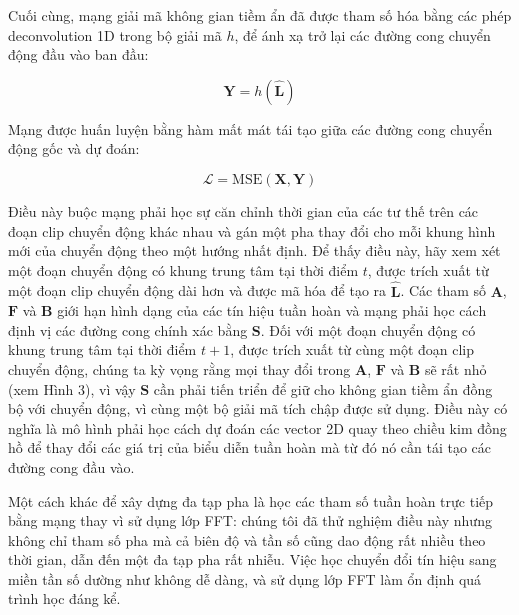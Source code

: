 Cuối cùng, mạng giải mã không gian tiềm ẩn đã được tham số hóa bằng các phép deconvolution 1D trong bộ giải mã $h$, để ánh xạ trở lại các đường cong chuyển động đầu vào ban đầu:

\begin{equation}
	\label{eq:Decoder}
	\textbf{Y} = h(\hat{\textbf{L}})
\end{equation}

Mạng được huấn luyện bằng hàm mất mát tái tạo giữa các đường cong chuyển động gốc và dự đoán:

\begin{equation}
	\label{eq:LossFunction}
	\mathcal{L} = \text{MSE}(\textbf{X}, \textbf{Y})
\end{equation}

Điều này buộc mạng phải học sự căn chỉnh thời gian của các tư thế trên các đoạn clip chuyển động khác nhau và gán một pha thay đổi cho mỗi khung hình mới của chuyển động theo một hướng nhất định. Để thấy điều này, hãy xem xét một đoạn chuyển động có khung trung tâm tại thời điểm $t$, được trích xuất từ một đoạn clip chuyển động dài hơn và được mã hóa để tạo ra $\hat{\textbf{L}}$. Các tham số $\textbf{A}$, $\textbf{F}$ và $\textbf{B}$ giới hạn hình dạng của các tín hiệu tuần hoàn và mạng phải học cách định vị các đường cong chính xác bằng $\textbf{S}$. Đối với một đoạn chuyển động có khung trung tâm tại thời điểm $t + 1$, được trích xuất từ cùng một đoạn clip chuyển động, chúng ta kỳ vọng rằng mọi thay đổi trong $\textbf{A}$, $\textbf{F}$ và $\textbf{B}$ sẽ rất nhỏ (xem Hình 3), vì vậy $\textbf{S}$ cần phải tiến triển để giữ cho không gian tiềm ẩn đồng bộ với chuyển động, vì cùng một bộ giải mã tích chập được sử dụng. Điều này có nghĩa là mô hình phải học cách dự đoán các vector 2D quay theo chiều kim đồng hồ để thay đổi các giá trị của biểu diễn tuần hoàn mà từ đó nó cần tái tạo các đường cong đầu vào.

Một cách khác để xây dựng đa tạp pha là học các tham số tuần hoàn trực tiếp bằng mạng thay vì sử dụng lớp FFT: chúng tôi đã thử nghiệm điều này nhưng không chỉ tham số pha mà cả biên độ và tần số cũng dao động rất nhiều theo thời gian, dẫn đến một đa tạp pha rất nhiễu. Việc học chuyển đổi tín hiệu sang miền tần số dường như không dễ dàng, và sử dụng lớp FFT làm ổn định quá trình học đáng kể.

